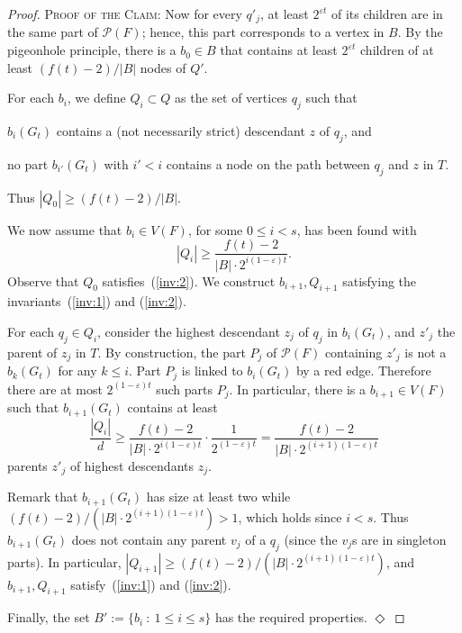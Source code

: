 \documentclass[a4paper,UKenglish,cleveref,hyperref,autoref]{lipics-v2021}
\renewcommand{\geq}{\geqslant}
\renewcommand{\leq}{\leqslant}
\newenvironment{proofofclaim}{\noindent \textsc{Proof of the Claim:}}{\hfill$\Diamond$\medskip}
\renewcommand{\P}{{\mathcal P}}
\begin{document}
\begin{proof}
\begin{proofofclaim}
  Now for every $q'_j$, at least $2^{\varepsilon t}$ of its children are in the same part of $\P(F)$; hence, this part corresponds to a vertex in $B$.
  By the pigeonhole principle, there is a $b_0 \in B$ that contains at least $2^{\varepsilon t}$ children of at least $(f(t)-2)/|B|$ nodes of $Q'$.

  For each $b_i$, we define $Q_i \subset Q$ as the set of vertices $q_j$ such that
  \begin{compactitem}
  \item $b_i(G_t)$ contains a (not necessarily strict) descendant $z$ of $q_j$, and
  \item no part $b_{i'}(G_t)$ with $i' < i$ contains a node on the path between $q_j$ and $z$ in $T$.
  \end{compactitem}
  Thus $|Q_0| \geq (f(t)-2)/|B|$.

  We now assume that $b_i \in V(F)$, for some $0 \leq i < s$, has been found with
  \begin{equation}\label{inv:2}
    |Q_i| \geq \frac{f(t)-2}{|B| \cdot 2^{i(1-\varepsilon)t}}.
  \end{equation}
  Observe that $Q_0$ satisfies~(\ref{inv:2}).
  We construct $b_{i+1}, Q_{i+1}$ satisfying the invariants~(\ref{inv:1}) and (\ref{inv:2}).

  For each $q_j \in Q_i$, consider the highest descendant $z_j$ of $q_j$ in $b_i(G_t)$, and $z'_j$ the parent of $z_j$ in $T$.
  By construction, the part $P_j$ of $\P(F)$ containing $z'_j$ is not a $b_k(G_t)$ for any $k \leq i$.
  Part $P_j$ is linked to $b_i(G_t)$ by a red edge.
  Therefore there are at most $2^{(1-\varepsilon) t}$ such parts $P_j$.
  In particular, there is a $b_{i+1} \in V(F)$ such that $b_{i+1}(G_t)$ contains at least
  $$\frac{|Q_i|}{d} \geq \frac{f(t)-2}{|B| \cdot 2^{i(1-\varepsilon) t}} \cdot \frac{1}{2^{(1-\varepsilon) t}} = \frac{f(t)-2}{|B| \cdot 2^{(i+1)(1-\varepsilon) t}}$$
  parents $z'_j$ of highest descendants $z_j$.

  Remark that $b_{i+1}(G_t)$ has size at least two while $(f(t)-2)/(|B| \cdot 2^{(i+1)(1-\varepsilon) t})>1$, which holds since $i<s$.
  Thus $b_{i+1}(G_t)$ does not contain any parent $v_j$ of a $q_j$ (since the $v_j$s are in singleton parts).
  In particular, $|Q_{i+1}| \geq (f(t)-2)/(|B| \cdot 2^{(i+1)(1-\varepsilon) t})$, and $b_{i+1}, Q_{i+1}$ satisfy~(\ref{inv:1}) and (\ref{inv:2}).

  Finally, the set $B':=\{b_i~:~1 \leq i \leq s\}$ has the required properties.
\end{proofofclaim}


\end{proof}
\end{document}
